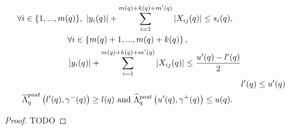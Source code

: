 \begin{lemma}
\begin{align}
\begin{split}
\end{split}\\
\begin{split}
& \forall
i\in\{1,...,m(q)\},~\left|y_i(q)\right|+\sum_{i=1}^{m(q)+k(q)+m^\prime(q)}\left|X_{ij}(q)\right|\leq
s_i(q),
\end{split}\\
\begin{split}
& \forall
i\in\left\{m(q)+1,...,m(q)+k(q)\right\},\\
&\left|y_i(q)\right|+\sum_{i=1}^{m(q)+k(q)+m^\prime(q)}\left|X_{ij}(q)\right|\leq
\frac{u^\prime(q)-l^\prime(q)}{2}
\end{split}\\
& l^\prime(q)\leq u^\prime(q)\\
\begin{split}
& \overline{\Lambda}_{q}^{post}\left(l^\prime(q),\gamma^-(q)\right)\geq
l(q)~\text{and}~\widehat{\Lambda}_{q}^{post}\left(u^\prime(q),\gamma^+(q)\right)\leq u(q).
\end{split}
\end{align}
\end{lemma}
\begin{proof}
{\color{red} TODO}
\end{proof}

